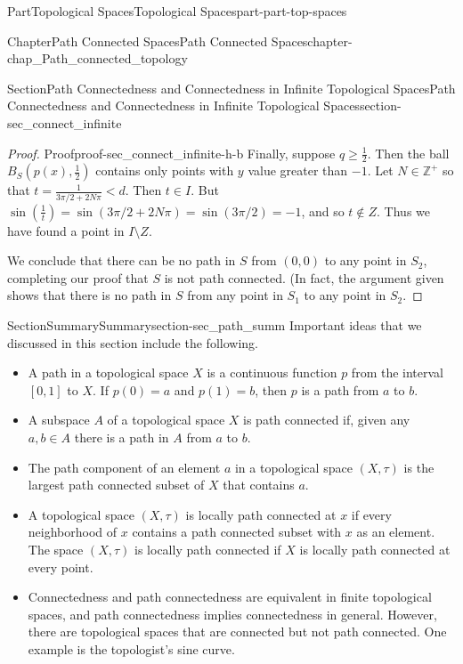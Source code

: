 \documentclass[oneside,10pt,]{book}
\numberwithin{equation}{chapter}
\newcommand{\Z}{\mathbb{Z}}
\newcommand{\lt}{<}
\begin{document}
\begin{partptx}{Part}{Topological Spaces}{}{Topological Spaces}{}{}{part-part-top-spaces}
\begin{chapterptx}{Chapter}{Path Connected Spaces}{}{Path Connected Spaces}{}{}{chapter-chap_Path_connected_topology}
\begin{sectionptx}{Section}{Path Connectedness and Connectedness in Infinite Topological Spaces}{}{Path Connectedness and Connectedness in Infinite Topological Spaces}{}{}{section-sec_connect_infinite}
\begin{proof}{Proof}{}{proof-sec_connect_infinite-h-b}
Finally, suppose \(q \geq \frac{1}{2}\). Then the ball \(B_S\left(p(x), \frac{1}{2}\right)\) contains only points with \(y\) value greater than \(-1\). Let \(N \in \Z^+\) so that \(t=\frac{1}{3\pi/2+2N\pi} \lt d\). Then \(t \in I\). But \(\sin\left(\frac{1}{t}\right) = \sin(3\pi/2 + 2N\pi) = \sin(3\pi/2) = -1\), and so \(t \notin Z\). Thus we have found a point in \(I \setminus Z\).%
\par
We conclude that there can be no path in \(S\) from \((0,0)\) to any point in \(S_2\), completing our proof that \(S\) is not path connected. (In fact, the argument given shows that there is no path in \(S\) from any point in \(S_1\) to any point in \(S_2\).%
\end{proof}
\end{sectionptx}
%
%
\typeout{************************************************}
\typeout{************************************************}
%
\begin{sectionptx}{Section}{Summary}{}{Summary}{}{}{section-sec_path_summ}
Important ideas that we discussed in this section include the following.%
\begin{itemize}[label=\textbullet]
\item{}A path in a topological space \(X\) is a continuous function \(p\) from the interval \([0,1]\) to \(X\). If \(p(0) = a\) and \(p(1) = b\), then \(p\) is a path from \(a\) to \(b\).%
\item{}A subspace \(A\) of a topological space \(X\) is path connected if, given any \(a,
b \in A\) there is a path in \(A\) from \(a\) to \(b\).%
\item{}The path component of an element \(a\) in a topological space \((X, \tau)\) is the largest path connected subset of \(X\) that contains \(a\).%
\item{}A topological space \((X, \tau)\) is locally path connected at \(x\) if every neighborhood of \(x\) contains a path connected subset with \(x\) as an element. The space \((X, \tau)\) is locally path connected if \(X\) is locally path connected at every point.%
\item{}Connectedness and path connectedness are equivalent in finite topological spaces, and path connectedness implies connectedness in general. However, there are topological spaces that are connected but not path connected. One example is the topologist's sine curve.%
\end{itemize}
%
\end{sectionptx}
%
%
\typeout{************************************************}

\end{chapterptx}
\end{partptx}
\end{document}
